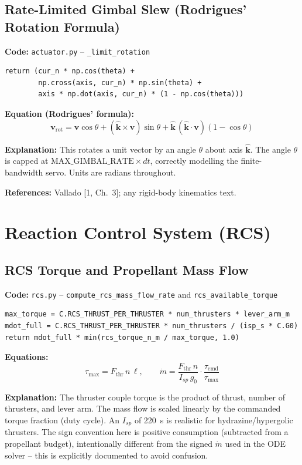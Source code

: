 \documentclass[12pt,a4paper]{article}
\begin{document}
\subsection{Rate-Limited Gimbal Slew (Rodrigues' Rotation Formula)}

\textbf{Code:} \texttt{actuator.py} – \texttt{\_limit\_rotation}
\begin{verbatim}
return (cur_n * np.cos(theta) +
        np.cross(axis, cur_n) * np.sin(theta) +
        axis * np.dot(axis, cur_n) * (1 - np.cos(theta)))
\end{verbatim}

\textbf{Equation (Rodrigues' formula):}
\[
\mathbf{v}_{\text{rot}} = \mathbf{v}\cos\theta + (\hat{\mathbf{k}}\times\mathbf{v})\sin\theta + \hat{\mathbf{k}}\,(\hat{\mathbf{k}}\cdot\mathbf{v})(1-\cos\theta)
\]

\textbf{Explanation:} This rotates a unit vector by an angle $\theta$ about axis $\hat{\mathbf{k}}$. The angle $\theta$ is capped at $\text{MAX\_GIMBAL\_RATE}\times dt$, correctly modelling the finite-bandwidth servo. Units are radians throughout.

\textbf{References:} Vallado [1, Ch.~3]; any rigid-body kinematics text.

\section{Reaction Control System (RCS)}

\subsection{RCS Torque and Propellant Mass Flow}

\textbf{Code:} \texttt{rcs.py} – \texttt{compute\_rcs\_mass\_flow\_rate} and \texttt{rcs\_available\_torque}
\begin{verbatim}
max_torque = C.RCS_THRUST_PER_THRUSTER * num_thrusters * lever_arm_m
mdot_full = C.RCS_THRUST_PER_THRUSTER * num_thrusters / (isp_s * C.G0)
return mdot_full * min(rcs_torque_n_m / max_torque, 1.0)
\end{verbatim}

\textbf{Equations:}
\[
\tau_{\max} = F_{\text{thr}}\,n\,\ell,\qquad
\dot{m} = \frac{F_{\text{thr}}\,n}{I_{sp}\,g_0}\cdot \frac{\tau_{\text{cmd}}}{\tau_{\max}}
\]

\textbf{Explanation:} The thruster couple torque is the product of thrust, number of thrusters, and lever arm. The mass flow is scaled linearly by the commanded torque fraction (duty cycle). An $I_{sp}$ of 220~s is realistic for hydrazine/hypergolic thrusters. The sign convention here is positive consumption (subtracted from a propellant budget), intentionally different from the signed $\dot{m}$ used in the ODE solver -- this is explicitly documented to avoid confusion.
\end{document}
